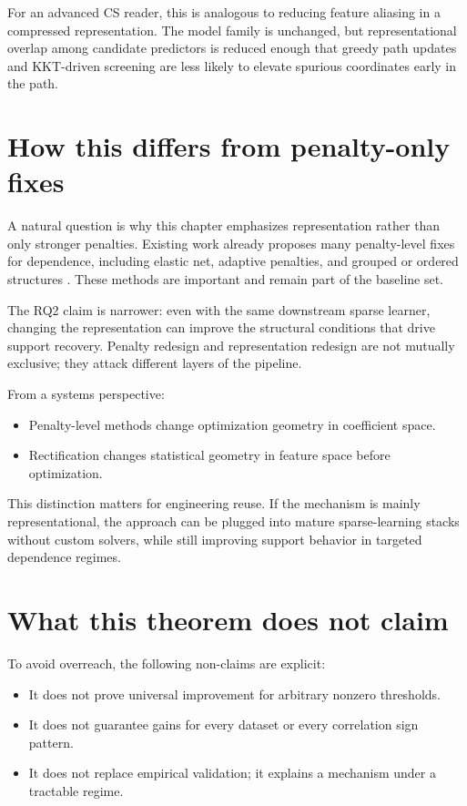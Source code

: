 For an advanced CS reader, this is analogous to reducing feature aliasing in a compressed representation. The model family is unchanged, but representational overlap among candidate predictors is reduced enough that greedy path updates and KKT-driven screening are less likely to elevate spurious coordinates early in the path.

\section{How this differs from penalty-only fixes}

A natural question is why this chapter emphasizes representation rather than only stronger penalties. Existing work already proposes many penalty-level fixes for dependence, including elastic net, adaptive penalties, and grouped or ordered structures \autocites{HZou2005Regularization,HZou2006adaptive,yuan2006,RTibshirani2016ordered}. These methods are important and remain part of the baseline set.

The RQ2 claim is narrower: even with the same downstream sparse learner, changing the representation can improve the structural conditions that drive support recovery. Penalty redesign and representation redesign are not mutually exclusive; they attack different layers of the pipeline.

From a systems perspective:
\begin{itemize}
    \item Penalty-level methods change optimization geometry in coefficient space.
    \item Rectification changes statistical geometry in feature space before optimization.
\end{itemize}

This distinction matters for engineering reuse. If the mechanism is mainly representational, the approach can be plugged into mature sparse-learning stacks without custom solvers, while still improving support behavior in targeted dependence regimes.

\section{What this theorem does not claim}

To avoid overreach, the following non-claims are explicit:
\begin{itemize}
    \item It does not prove universal improvement for arbitrary nonzero thresholds.
    \item It does not guarantee gains for every dataset or every correlation sign pattern.
    \item It does not replace empirical validation; it explains a mechanism under a tractable regime.
\end{itemize}

